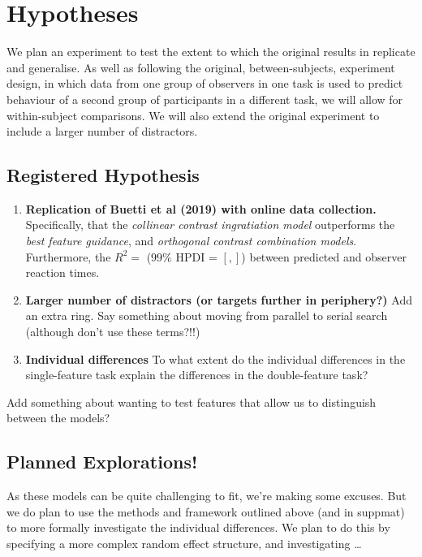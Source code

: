 \documentclass[smallextended, natbib]{svjour3}       %
\begin{document}
\section{Hypotheses}

We plan an experiment to test the extent to which the original results in \cite{buetti2019predicting} replicate and generalise. As well as following the original, between-subjects, experiment design, in which data from one group of observers in one task is used to predict behaviour of a second group of participants in a different task, we will allow for within-subject comparisons. We will also extend the original experiment to include a larger number of distractors. 

\subsection{Registered Hypothesis}

\begin{enumerate}
\item \textbf{Replication of Buetti et al (2019) with online data collection.} Specifically, that the \textit{collinear contrast ingratiation model} outperforms the \textit{best feature guidance}, and \textit{orthogonal contrast combination models}.  Furthermore, the $R^2 = $ ($99\%$ HPDI = $[, ]$) between predicted and observer reaction times.\\
\item \textbf{Larger number of distractors (or targets further in periphery?)} Add an extra ring. Say something about moving from parallel to serial search (although don't use these terms?!!) \\ 
\item \textbf{Individual differences} To what extent do the individual differences in the single-feature task explain the differences in the double-feature task?

\end{enumerate}

Add something about wanting to test features that allow us to distinguish between the models?


\subsection{Planned Explorations!}

As these models can be quite challenging to fit, we're making some excuses. But we do plan to use the methods and framework outlined above (and in suppmat) to more formally investigate the individual differences. We plan to do this by specifying a more complex random effect structure, and investigating \ldots
\end{document}
